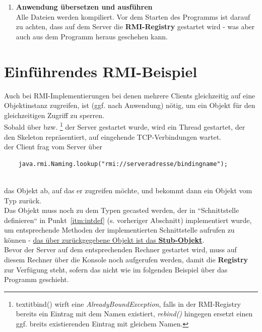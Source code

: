 \begin{enumerate}
    \item \textbf{Anwendung übersetzen und ausführen}\\
    \noindent
    Alle Dateien werden kompiliert.
    Vor dem Starten des Programms ist darauf zu achten, dass auf dem Server die \textbf{RMI-Registry} gestartet wird - was aber auch aus dem Programm heraus geschehen kann.
\end{enumerate}

\section{Einführendes RMI-Beispiel}

Auch bei RMI-Implementierungen bei denen mehrere Clients gleichzeitig auf eine Objektinstanz zugreifen, ist (ggf. nach Anwendung)  nötig, um ein Objekt für den gleichzeitigen Zugriff zu sperren.\\

\noindent
Sobald über  bzw. \footnote{
textit{bind()} wirft eine \textit{AlreadyBoundException}, falls in der RMI-Registry bereits ein Eintrag mit dem Namen existiert, \textit{rebind()} hingegen ersetzt einen ggf. breits existierenden Eintrag mit gleichem Namen.
} der Server gestartet wurde, wird ein Thread gestartet, der den Skeleton repräsentiert, auf eingehende TCP-Verbindungen wartet.\\

\noindent
der Client frag vom Server über

\begin{verbatim}
    java.rmi.Naming.lookup("rmi://serveradresse/bindingname");
\end{verbatim}\\

das Objekt ab, auf das er zugreifen möchte, und bekommt dann ein Objekt vom Typ  zurück.\\
Das Objekt muss noch zu dem Typen gecasted werden, der in ``Schnittstelle definieren`` in Punkt~\ref{itm:intdef} (s. vorheriger Abschnitt) implementiert wurde, um entsprechende Methoden der implementierten Schnittstelle aufrufen zu können - \ul{das über }\ul{ zurückgegebene Objekt ist das \textbf{Stub-Objekt}}.\\

\noindent
Bevor der Server auf dem entsprechenden Rechner gestartet wird, muss auf diesem Rechner über die Konsole noch  aufgerufen werden, damit die \textbf{Registry} zur Verfügung steht, sofern das nicht wie im folgenden Beispiel über das Programm geschieht.\\

